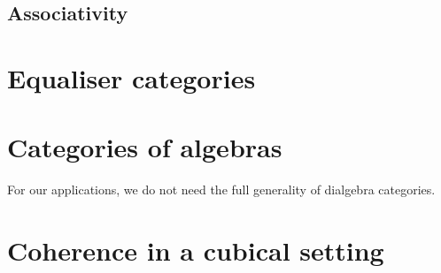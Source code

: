 \subsection{Associativity}

\section{Equaliser categories}

\section{Categories of algebras}

For our applications, we do not need the full generality of dialgebra categories. 

\section{Coherence in a cubical setting}


